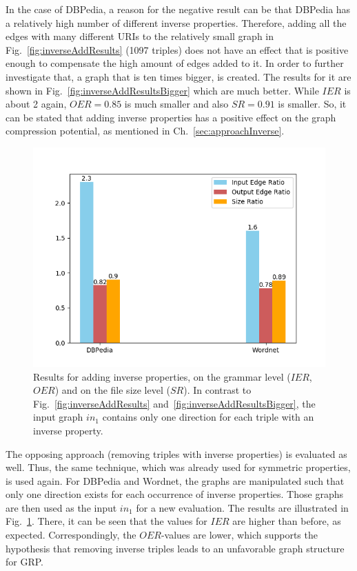 In the case of DBPedia, a reason for the negative result can be that DBPedia has a relatively high number of different inverse properties. Therefore, adding all the edges with many different URIs to the relatively small graph in Fig.~\ref{fig:inverseAddResults} (1097 triples) does not have an effect that is positive enough to compensate the high amount of edges added to it. In order to further investigate that, a graph that is ten times bigger, is created. The results for it are shown in Fig.~\ref{fig:inverseAddResultsBigger} which are much better. While $IER$ is about 2 again, $OER=0.85$ is much smaller and also $SR=0.91$ is smaller. So, it can be stated that adding inverse properties has a positive effect on the graph compression potential, as mentioned in Ch.~\ref{sec:approachInverse}.



\begin{figure}
	\centering
	\includegraphics[width=0.8\linewidth]{figures/4_evaluation/ontology/ratiosInverseAdd2}
	\caption{Results for adding inverse properties, on the grammar level ($IER$, $OER$) and on the file size level ($SR$). In contrast to Fig.~\ref{fig:inverseAddResults} and~\ref{fig:inverseAddResultsBigger}, the input graph $in_1$ contains only one direction for each triple with an inverse property.}
	\label{fig:inverseAddResults2}
\end{figure}


The opposing approach (removing triples with inverse properties) is evaluated as well. Thus, the same technique, which was already used for symmetric properties, is used again. For DBPedia and Wordnet, the graphs are manipulated such that only one direction exists for each occurrence of inverse properties. Those graphs are then used as the input $in_1$ for a new evaluation. The results are illustrated in Fig.~\ref{fig:inverseAddResults2}. There, it can be seen that the values for $IER$ are higher than before, as expected. Correspondingly, the $OER$-values are lower, which supports the hypothesis that removing inverse triples leads to an unfavorable graph structure for GRP.

